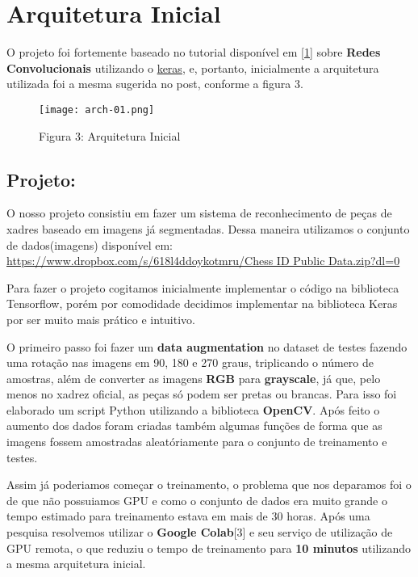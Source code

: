     \section{Arquitetura Inicial}\label{arquitetura-inicial}

O projeto foi fortemente baseado no tutorial disponível em
\href{http://adventuresinmachinelearning.com/keras-tutorial-cnn-11-lines/}{[1]} sobre \textbf{Redes
Convolucionais} utilizando o \href{https://keras.io/}{keras}, e, portanto, inicialmente a
arquitetura utilizada foi a mesma sugerida no post, conforme a figura 3.

\begin{figure}[ht]
\centering
\texttt{[image: arch-01.png]}
\caption{Figura 3: Arquitetura Inicial}
\end{figure}


    \subsection{Projeto:}\label{projeto}

O nosso projeto consistiu em fazer um sistema de reconhecimento de peças
de xadres baseado em imagens já segmentadas. Dessa maneira utilizamos o
conjunto de dados(imagens) disponível em:
\href{https://www.dropbox.com/s/618l4ddoykotmru/Chess\%20ID\%20Public\%20Data.zip?dl=0}{
https://www.dropbox.com/s/618l4ddoykotmru/Chess ID Public Data.zip?dl=0}

Para fazer o projeto cogitamos inicialmente implementar o código na
biblioteca Tensorflow, porém por comodidade decidimos implementar na
biblioteca Keras por ser muito mais prático e intuitivo.

O primeiro passo foi fazer um \textbf{data augmentation} no dataset de
testes fazendo uma rotação nas imagens em 90, 180 e 270 graus,
triplicando o número de amostras, além de converter as imagens
\textbf{RGB} para \textbf{grayscale}, já que, pelo menos no xadrez
oficial, as peças só podem ser pretas ou brancas. Para isso foi
elaborado um script Python utilizando a biblioteca \textbf{OpenCV}. Após
feito o aumento dos dados foram criadas também algumas funções de forma
que as imagens fossem amostradas aleatóriamente para o conjunto de
treinamento e testes.

Assim já poderiamos começar o treinamento, o problema que nos deparamos
foi o de que não possuiamos GPU e como o conjunto de dados era muito
grande o tempo estimado para treinamento estava em mais de 30 horas.
Após uma pesquisa resolvemos utilizar o \textbf{Google Colab}[3] e seu
serviço de utilização de GPU remota, o que reduziu o tempo de
treinamento para \textbf{10 minutos} utilizando a mesma arquitetura
inicial.

